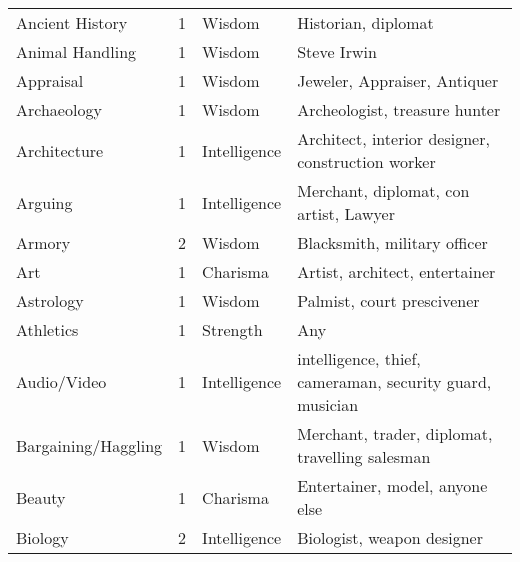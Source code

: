 \documentclass[twoside]{book}
\begin{document}
\begin{longtable}{p{1.25in}llp{12em}}
  \tabularnewline
      
  \raggedright
           Ancient History 
  &
   1 
  &
   Wisdom 
  &
   Historian, diplomat
           
  \tabularnewline
      
  \raggedright
           Animal Handling 
  &
   1 
  &
   Wisdom 
  &
   Steve Irwin 
  \tabularnewline
      
  \raggedright
           Appraisal 
  &
   1 
  &
   Wisdom 
  &
   Jeweler, Appraiser,
           Antiquer 
  \tabularnewline
      
  \raggedright
           Archaeology 
  &
   1 
  &
   Wisdom 
  &
   Archeologist, treasure
           hunter 
  \tabularnewline
      
  \raggedright
           Architecture 
  &
   1 
  &
   Intelligence 
  &
   Architect, interior
           designer, construction worker 
  \tabularnewline
      
  \raggedright
           Arguing 
  &
   1 
  &
   Intelligence 
  &
   Merchant, diplomat, con
           artist, Lawyer 
  \tabularnewline
      
  \raggedright
           Armory 
  &
   2 
  &
   Wisdom 
  &
   Blacksmith, military
           officer 
  \tabularnewline
      
  \raggedright
           Art 
  &
   1 
  &
   Charisma 
  &
   Artist, architect,
           entertainer 
  \tabularnewline
      
  \raggedright
           Astrology 
  &
   1 
  &
   Wisdom 
  &
   Palmist, court
           prescivener 
  \tabularnewline
      
  \raggedright
           Athletics 
  &
   1 
  &
   Strength 
  &
   Any 
  \tabularnewline
      
  \raggedright
           Audio/Video 
  &
   1 
  &
   Intelligence 
  &
   intelligence, thief,
           cameraman, security guard, musician 
  \tabularnewline
      
  \raggedright
           Bargaining/Haggling 
  &
   1 
  &
   Wisdom 
  &
   Merchant, trader,
           diplomat, travelling salesman 
  \tabularnewline
      
  \raggedright
           Beauty 
  &
   1 
  &
   Charisma 
  &
   Entertainer, model,
           anyone else 
  \tabularnewline
      
  \raggedright
           Biology 
  &
   2 
  &
   Intelligence 
  &
   Biologist, weapon
           designer 
  \tabularnewline
      

\end{longtable}
\end{document}
